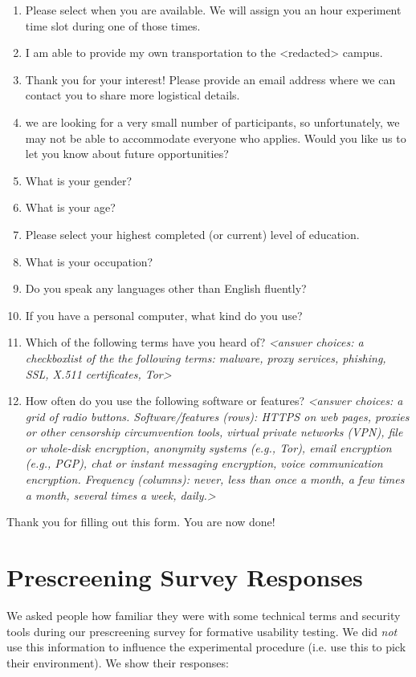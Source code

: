 \documentclass[USenglish,oneside,twocolumn]{article}
\begin{document}
\begin{enumerate}
\item{Please select when you are available. We will assign you an hour experiment time slot during one of those times.}
\item{I am able to provide my own transportation to the <redacted> %
campus.}
\item{Thank you for your interest! Please provide an email address where we can contact you to share more logistical details.}
\item{we are looking for a very small number of participants, so unfortunately, we may not be able to accommodate everyone who applies. Would you like us to let you know about future opportunities?}
\item{What is your gender?}
\item{What is your age?}
\item{Please select your highest completed (or current) level of education.}
\item{What is your occupation?} 
\item{Do you speak any languages other than English fluently?}
\item{If you have a personal computer, what kind do you use?}
\item{Which of the following terms have you heard of? \textit{<answer choices: a checkboxlist of the the following terms: malware, proxy services, phishing, SSL, X.511 certificates, Tor>}}
\item{How often do you use the following software or features? \textit{<answer choices: a grid of radio buttons. Software/features (rows): HTTPS on web pages, proxies or other censorship circumvention tools, virtual private networks (VPN), file or whole-disk encryption, anonymity systems (e.g., Tor), email encryption (e.g., PGP), chat or instant messaging encryption, voice communication encryption. Frequency (columns): never, less than once a month, a few times a month, several times a week, daily.>}}
\end{enumerate}
Thank you for filling out this form. You are now done!

\section{Prescreening Survey Responses}
\label{prescreening-responses}
We asked people how familiar they were with some technical terms and security tools during our prescreening survey for formative usability testing. We did {\it not} use this information to influence the experimental procedure (i.e. use this to pick their environment). We show their responses: 
\end{document}
